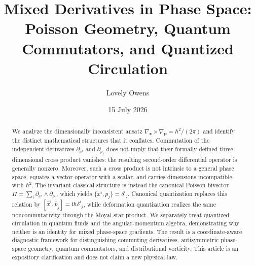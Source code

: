 \documentclass[11pt]{article}
\title{\textbf{Mixed Derivatives in Phase Space:}\\
Poisson Geometry, Quantum Commutators, and Quantized Circulation}
\author{Lovely Owens}
\date{15 July 2026}
\newcommand{\ii}{\mathrm{i}}
\begin{document}
\maketitle

\begin{abstract}
We analyze the dimensionally inconsistent ansatz
\(
\nabla_{\bm{x}}\times\nabla_{\bm{p}}=\hbar^2/(2\pi)
\)
and identify the distinct mathematical structures that it conflates. Commutation of the independent derivatives \(\partial_{x^i}\) and \(\partial_{p_j}\) does not imply that their formally defined three-dimensional cross product vanishes: the resulting second-order differential operator is generally nonzero. Moreover, such a cross product is not intrinsic to a general phase space, equates a vector operator with a scalar, and carries dimensions incompatible with \(\hbar^2\). The invariant classical structure is instead the canonical Poisson bivector
\(
\Pi=\sum_i \partial_{x^i}\wedge\partial_{p_i}
\),
which yields \(\{x^i,p_j\}=\delta^i{}_j\). Canonical quantization replaces this relation by \([\hat x^i,\hat p_j]=\ii\hbar\delta^i{}_j\), while deformation quantization realizes the same noncommutativity through the Moyal star product. We separately treat quantized circulation in quantum fluids and the angular-momentum algebra, demonstrating why neither is an identity for mixed phase-space gradients. The result is a coordinate-aware diagnostic framework for distinguishing commuting derivatives, antisymmetric phase-space geometry, quantum commutators, and distributional vorticity. This article is an expository clarification and does not claim a new physical law.
\end{abstract}



















\printbibliography
\end{document}
